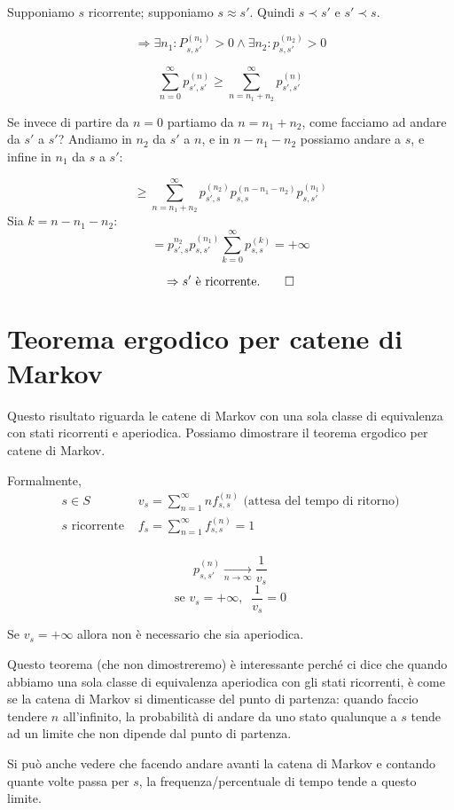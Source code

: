 \documentclass[a4paper,12pt]{book}
\begin{document}
Supponiamo $ s $ ricorrente; supponiamo $ s \approx s' $. Quindi $ s \prec s' $ e $ s' \prec s $. 

$$ \Rightarrow \exists n_1 : P_{s,s'}^{(n_1)} > 0 \land \exists n_2 : p_{s,s'}^{(n_2)} > 0 $$

$$ \sum_{n=0}^{\infty} p_{s',s'}^{(n)} \ge \sum_{n = n_1 + n_2}^{\infty} p_{s',s'}^{(n)} $$ 

Se invece di partire da $ n = 0 $ partiamo da $ n = n_1+n_2 $, come facciamo ad andare da $ s' $ a $ s' $? Andiamo in $ n_2 $ da $ s' $ a $ n $, e in $ n - n_1 - n_2 $ possiamo andare a $ s $, e infine in $ n_1 $ da $ s $ a $ s' $:

$$ \ge \sum_{n=n_1+n_2}^{\infty} p_{s',s}^{(n_2)} p_{s,s}^{(n-n_1-n_2)} p_{s,s'}^{(n_1)} $$
Sia $ k = n-n_1-n_2 $:
$$ = p_{s',s}^{n_2} p_{s,s'}^{(n_1)} \sum_{k=0}^{\infty} p_{s,s}^{(k)} = +\infty$$

$$ \Rightarrow s' \text{ è ricorrente.} \qed $$

\section{Teorema ergodico per catene di Markov}
Questo risultato riguarda le catene di Markov con una sola classe di equivalenza con stati ricorrenti e aperiodica. Possiamo dimostrare il teorema ergodico per catene di Markov. 

Formalmente, 
$$ 
\begin{array}{cc}
	s \in S & v_s = \sum_{n=1}^{\infty} n f_{s,s}^{(n)} \text{ (attesa del tempo di ritorno)} \\
	s \text{ ricorrente } & f_s = \sum_{n=1}^{\infty} f_{s,s}^{(n)} = 1 \\  
\end{array} $$

$$ p_{s,s'}^{(n)} \underset{n \to \infty}{\longrightarrow} \frac{1}{v_s} $$
$$ \text{se } v_s = +\infty, \; \; \frac{1}{v_s} = 0 $$

Se $ v_s = +\infty $ allora non è necessario che sia aperiodica. 

Questo teorema (che non dimostreremo) è interessante perché ci dice che quando abbiamo una sola classe di equivalenza aperiodica con gli stati ricorrenti, è come se la catena di Markov si dimenticasse del punto di partenza: quando faccio tendere $ n $ all'infinito, la probabilità di andare da uno stato qualunque a $ s $ tende ad un limite che non dipende dal punto di partenza.

Si può anche vedere che facendo andare avanti la catena di Markov e contando quante volte passa per $ s $, la frequenza/percentuale di tempo tende a questo limite. 
\end{document}
